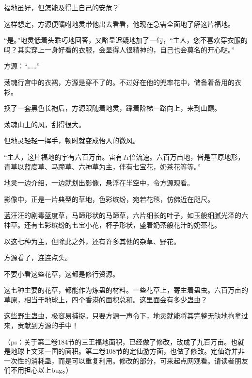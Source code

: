 \begin{this_body}
福地虽好，但怎能及得上自己的安危？

这样想定，方源便嘱咐地灵带他出去看看，他现在急需全面地了解这片福地。

“是。”地灵低着头乖巧地回答，又略显迟疑地加了一句，“主人，您不喜欢穿衣服的吗？其实穿上一身好看的衣服，会显得人很精神的，自己也会莫名的开心哒。”

方源：“……”

荡魂行宫中的衣裙，方源是穿不了的。不过好在他的兜率花中，储备着备用的衣衫。

换了一套黑色长袍后，方源跟随着地灵，踩着阶梯一路向上，来到山巅。

荡魂山上的风，刮得很大。

但地灵轻轻一挥手，顿时就变成怡人的微风。

“主人，这片福地的宇有六百万亩。宙有五倍流速。六百万亩地，皆是草原地形，青草以蓝度草、马蹄草、六神草为主，伴有七宝花，奶茶花等等。”

地灵一边介绍，一边就划出影像，悬浮在半空中，令方源观看。

影像中，正是一片典型的草地，色彩缤纷，宛若花毯，仿佛近在咫尺。

蓝汪汪的剧毒蓝度草，马蹄形状的马蹄草，六片细长的叶子，如玉般细腻光泽的六神草。还有七彩缤纷的七宝小花，杯子形状，盛着奶茶般花汁的奶茶花。

以这七种为主，但除此之外，还有许多其他的杂草、野花。

方源看了，连连点头。

不要小看这些花草，这都是修行资源。

这七种主要的花草，都能作为炼蛊的材料。一些花草上，寄生着蛊虫。六百万亩的草原，相当于地球上，四个香港的面积总和。这里面会有多少蛊虫？

这些野生蛊虫，极容易捕捉。只要方源一声令下，地灵就能将其完整无缺地拘拿过来，贡献到方源的手中！

（ps：关于第二卷184节的三王福地面积，已经做了修改，改成了九百万亩。也就是地球上文莱一国的面积。第二卷108节的定仙游方面，也做了修改。定仙游并非一次性的消耗蛊，而是可以重复利用。修改的部分，可来起点网观看。请读者朋友们不用担心以上bug。）

\end{this_body}

